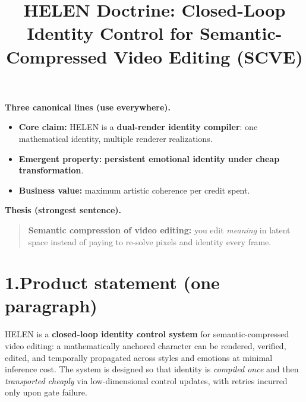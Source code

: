 \documentclass[10pt]{article}
\title{\vspace{-1.2em}\textbf{HELEN Doctrine: Closed-Loop Identity Control for Semantic-Compressed Video Editing (SCVE)}\vspace{-0.6em}}
\author{}
\date{\vspace{-1.2em}}
\begin{document}
\maketitle
\vspace{-1.0em}
\noindent\textbf{Three canonical lines (use everywhere).}
\begin{itemize}[leftmargin=1.2em,itemsep=0.15em,topsep=0.2em]
\item \textbf{Core claim:} HELEN is a \textbf{dual-render identity compiler}: one mathematical identity, multiple renderer realizations.
\item \textbf{Emergent property:} \textbf{persistent emotional identity under cheap transformation}.
\item \textbf{Business value:} maximum artistic coherence per credit spent.
\end{itemize}
\vspace{0.35em}
\noindent\textbf{Thesis (strongest sentence).}
\begin{quote}\small
\textbf{Semantic compression of video editing:} you edit \emph{meaning} in latent space instead of paying to re-solve pixels and identity every frame.
\end{quote}
\vspace{-0.4em}
\section*{1.\;Product statement (one paragraph)}
\noindent
HELEN is a \textbf{closed-loop identity control system} for semantic-compressed video editing: a mathematically anchored character can be rendered, verified, edited, and temporally propagated across styles and emotions at minimal inference cost. The system is designed so that identity is \emph{compiled once} and then \emph{transported cheaply} via low-dimensional control updates, with retries incurred only upon gate failure.
\end{document}
